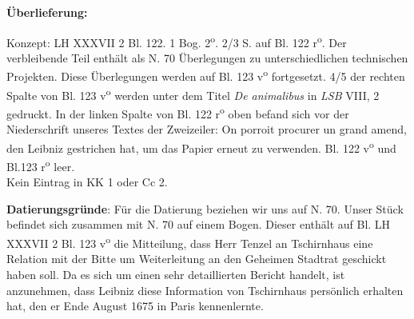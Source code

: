       
               
                \begin{ledgroupsized}[r]{120mm}
                \footnotesize 
                \pstart                
                \noindent\textbf{\"{U}berlieferung:}   
                \pend
                \end{ledgroupsized}
            
              
                            \begin{ledgroupsized}[r]{114mm}
                            \footnotesize 
                            \pstart \parindent -6mm
                            Konzept: LH XXXVII 2 Bl. 122. 1 Bog. 2\textsuperscript{o}. 2/3 S. auf Bl. 122 r\textsuperscript{o}. Der verbleibende Teil enth\"{a}lt als N. 70 \"{U}berlegungen zu unterschiedlichen technischen Projekten. Diese \"{U}berlegungen werden auf Bl. 123 v\textsuperscript{o} fortgesetzt. 4/5 der rechten Spalte von Bl. 123 v\textsuperscript{o} werden unter dem Titel \textit{De animalibus} in \textit{LSB} VIII, 2 gedruckt. In der linken Spalte von Bl. 122 r\textsuperscript{o} oben befand sich vor der Niederschrift unseres Textes der Zweizeiler: On porroit procurer un grand amend, den Leibniz gestrichen hat, um das Papier erneut zu verwenden. Bl. 122 v\textsuperscript{o} und Bl.123 r\textsuperscript{o} leer.\\Kein Eintrag in KK 1 oder Cc 2. \pend
                            \end{ledgroupsized}
                \vspace*{5mm}
                \begin{ledgroup}
                \footnotesize 
                \pstart
            \noindent\footnotesize{\textbf{Datierungsgr\"{u}nde}: F\"{u}r die Datierung beziehen wir uns auf N. 70. Unser St\"{u}ck befindet sich zusammen mit N. 70 auf einem Bogen. Dieser enth\"{a}lt auf Bl. LH XXXVII 2 Bl. 123 v\textsuperscript{o} die Mitteilung, dass Herr Tenzel\protect{} an Tschirnhaus\protect{} eine Relation mit der Bitte um Weiterleitung an den Geheimen Stadtrat geschickt haben soll. Da es sich um einen sehr detaillierten Bericht handelt, ist anzunehmen, dass Leibniz diese Information von Tschirnhaus\protect{} pers\"{o}nlich erhalten hat, den er Ende August 1675 in Paris\protect{} kennenlernte.}
                \pend
                \end{ledgroup}
            
